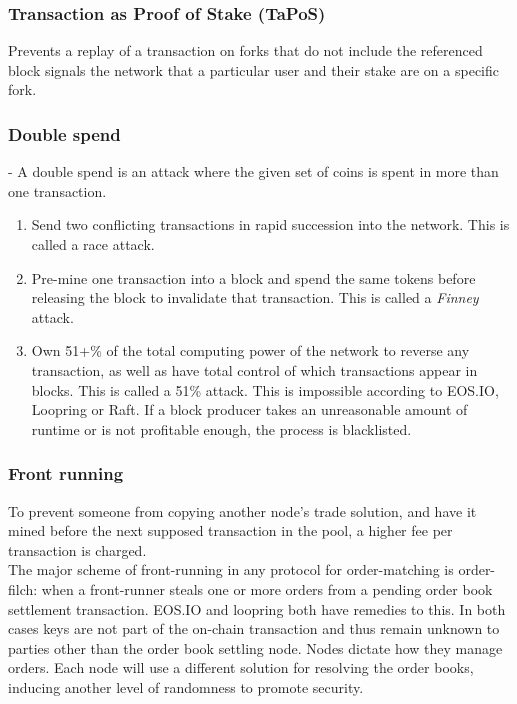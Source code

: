 \documentclass[]{article}
\begin{document}
		\subsubsection{Transaction as Proof of Stake (TaPoS)}
			Prevents a replay of a transaction on forks that do not include the referenced block 
			signals the network that a particular user and their stake are on a specific fork.
		\subsubsection{Double spend}-
		A double spend is an attack where the given set of coins is spent in more than one transaction.
		\begin{enumerate}
			\item Send two conflicting transactions in rapid succession into the network. This is called a race attack. 
			\item Pre-mine one transaction into a block and spend the same tokens before releasing the block to invalidate that transaction. 
			This is called a \textit{Finney} attack.
			\item Own 51+\% of the total computing power of the network to reverse any transaction, 
			as well as have total control of which transactions appear in blocks. 
			This is called a 51\% attack.
			This is impossible according to EOS.IO, Loopring or Raft.
			If a block producer takes an unreasonable amount of runtime or is not profitable enough, the process is blacklisted.\cite{7}
		\end{enumerate} 

		\subsubsection{Front running}
		To prevent someone from copying another node's trade solution, 
		and have it mined before the next supposed transaction in the pool, 
		a higher fee per transaction is charged.\\ 
		The major scheme of front-running in any protocol for
		order-matching is order-filch: when a front-runner steals
		one or more orders from a pending order book settlement
		transaction. EOS.IO and loopring both have remedies to this.
		In both cases keys are not part of the on-chain transaction and thus remain unknown to parties other than the order book settling node.
		Nodes dictate how they manage orders.
		Each node will use a different solution for resolving the order books, inducing another level of randomness to promote security.
			
\end{document}
